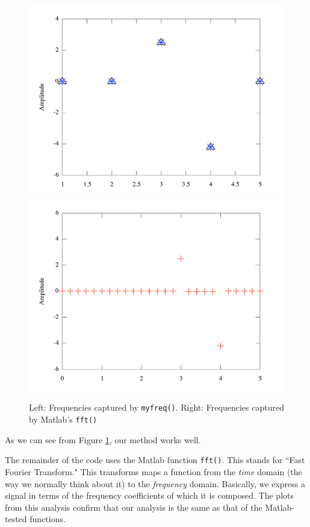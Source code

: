 \documentclass{article}
\begin{document}
\begin{figure}[htbp]
\begin{center}
\includegraphics[scale=0.4]{checking_fourier.pdf}
\includegraphics[scale=0.4]{mf_fft_frequencies.pdf}
\caption{Left: Frequencies captured by {\tt myfreq()}.  Right: Frequencies captured by Matlab's {\tt fft()}}
\label{fig:cmpmyfft}
\end{center}
\end{figure}

 As we can see from Figure \ref{fig:cmpmyfft}, our method works well.

The remainder of the code uses the Matlab function {\tt fft()}. This stands for ``Fast Fourier Transform."  This transforms maps a function from the {\it time} domain (the way we normally think about it) to the {\it frequency} domain.  Basically, we express a signal in terms of the frequency coefficients of which it is composed.  The plots from this analysis confirm that our analysis is the same as that of the Matlab-tested functions.
\end{document}
